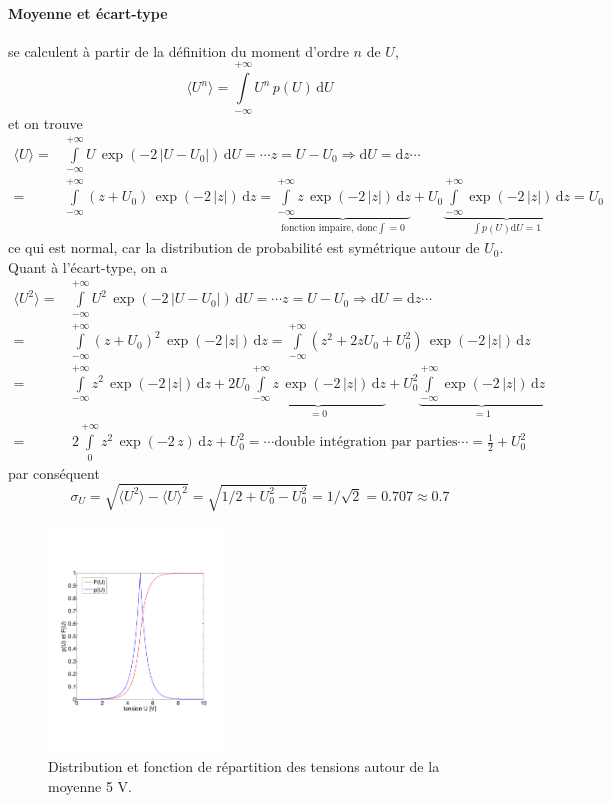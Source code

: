 \paragraph{Moyenne et écart-type} se calculent à partir de la définition du moment d'ordre $n$ de $U$,
$$
\langle U^n\rangle=\int\limits_{-\infty}^{+\infty} U^n\,p(U)\,\text{d}U
$$
et on trouve
\begin{align*}
\langle U \rangle=&\int\limits_{-\infty}^{+\infty} U\,\exp{(-2\,|U-U_0|)}\,\text{d}U=
\cdots z=U-U_0\Rightarrow\text{d}U=\text{d}z\cdots\\
=&\int\limits_{-\infty}^{+\infty} (z+U_0)\,\exp{(-2\,|z|)}\,\text{d}z
=\underbrace{\int\limits_{-\infty}^{+\infty} z\,\exp{(-2\,|z|)}\,\text{d}z}_{\text{fonction impaire, donc} \int=0}+
U_0\underbrace{\int\limits_{-\infty}^{+\infty} \exp{(-2\,|z|)}\,\text{d}z}_{\int p(U)\text{d}U=1}=U_0
\end{align*}
ce qui est normal, car la distribution de probabilité est symétrique autour de $U_0$. Quant à l'écart-type, on a
\begin{align*}
\langle U^2 \rangle=&\int\limits_{-\infty}^{+\infty} U^2\,\exp{(-2\,|U-U_0|)}\,\text{d}U=
\cdots z=U-U_0\Rightarrow\text{d}U=\text{d}z\cdots\\
=&\int\limits_{-\infty}^{+\infty} (z+U_0)^2\,\exp{(-2\,|z|)}\,\text{d}z
=\int\limits_{-\infty}^{+\infty} (z^2+2zU_0+U_0^2)\,\exp{(-2\,|z|)}\,\text{d}z\\
=&\int\limits_{-\infty}^{+\infty} z^2\,\exp{(-2\,|z|)}\,\text{d}z+
2U_0\underbrace{\int\limits_{-\infty}^{+\infty} z\,\exp{(-2\,|z|)}\,\text{d}z}_{=0}+
U_0^2\underbrace{\int\limits_{-\infty}^{+\infty} \exp{(-2\,|z|)}\,\text{d}z}_{=1}\\
=&\,2\int\limits_{0}^{+\infty} z^2\,\exp{(-2\,z)}\,\text{d}z+U_0^2=\cdots\text{double intégration par parties}\cdots=\frac{1}{2}+U_0^2
\end{align*}
par conséquent
$$
\sigma_U=\sqrt{\langle U^2 \rangle-\langle U\rangle^2}=\sqrt{1/2+U_0^2-U_0^2}=1/\sqrt{2}=0.707\approx 0.7
$$
\begin{figure}
   \centering
   \includegraphics[height=6cm]{assets/figures/Serie2_exe09fig1.pdf}
   \caption{Distribution et fonction de répartition des tensions autour de la moyenne 5 V.}
   \label{fig:exe13}
\end{figure}

